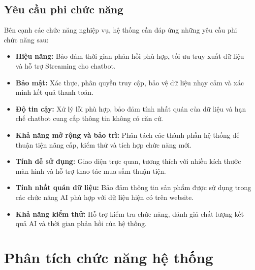 \documentclass{report}
\begin{document}
\subsection{Yêu cầu phi chức năng}
Bên cạnh các chức năng nghiệp vụ, hệ thống cần đáp ứng những yêu cầu phi chức năng sau:
\begin{itemize}
    \item \textbf{Hiệu năng:} Bảo đảm thời gian phản hồi phù hợp, tối ưu truy xuất dữ liệu và hỗ trợ Streaming cho chatbot.
    \item \textbf{Bảo mật:} Xác thực, phân quyền truy cập, bảo vệ dữ liệu nhạy cảm và xác minh kết quả thanh toán.
    \item \textbf{Độ tin cậy:} Xử lý lỗi phù hợp, bảo đảm tính nhất quán của dữ liệu và hạn chế chatbot cung cấp thông tin không có căn cứ.
    \item \textbf{Khả năng mở rộng và bảo trì:} Phân tách các thành phần hệ thống để thuận tiện nâng cấp, kiểm thử và tích hợp chức năng mới.
    \item \textbf{Tính dễ sử dụng:} Giao diện trực quan, tương thích với nhiều kích thước màn hình và hỗ trợ thao tác mua sắm thuận tiện.
    \item \textbf{Tính nhất quán dữ liệu:} Bảo đảm thông tin sản phẩm được sử dụng trong các chức năng AI phù hợp với dữ liệu hiện có trên website.
    \item \textbf{Khả năng kiểm thử:} Hỗ trợ kiểm tra chức năng, đánh giá chất lượng kết quả AI và thời gian phản hồi của hệ thống.
\end{itemize}


\section{Phân tích chức năng hệ thống}
\end{document}
